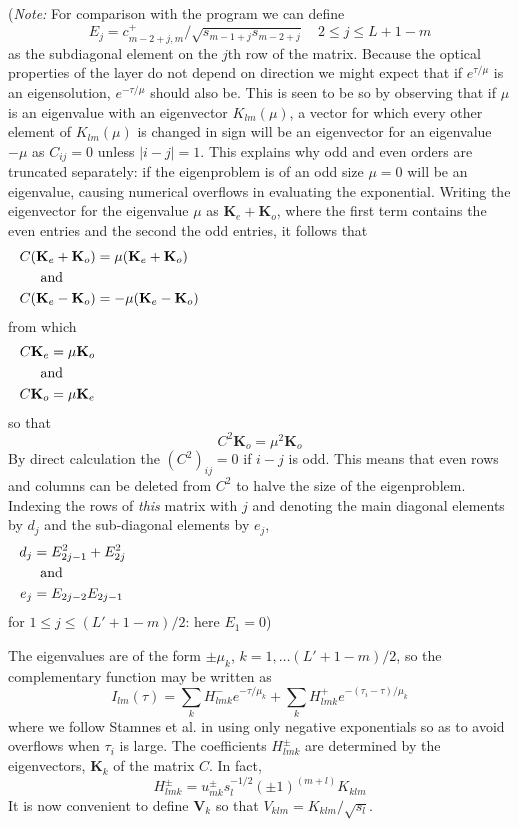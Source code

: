 ({\it Note:} For comparison with the program we can define 
\begin{equation}
E_j=c_{m-2+j,m}^+/\sqrt{s_{m-1+j}s_{m-2+j}} \quad 2 \leqslant j \leqslant L+1-m
\end{equation}
as the subdiagonal element on the $j$th row of the matrix. Because the
optical properties of the layer do not depend on direction we might expect
that if $e^{\tau/\mu}$ is an eigensolution, $e^{-\tau/\mu}$ should also be.
This is seen to be so by observing that if $\mu$ is an eigenvalue with an
eigenvector $K_{lm}(\mu)$, a vector for which every other element
of $K_{lm}(\mu)$ is changed in sign will be an eigenvector for an eigenvalue
$-\mu$ as $C_{ij}=0$ unless $|i-j|=1$. This explains why odd and even orders
are truncated separately: if the eigenproblem is of an odd size $\mu=0$ will
be an eigenvalue, causing numerical overflows in evaluating the exponential.
Writing the eigenvector for the eigenvalue $\mu$ as $\mathbf{K}_e
+\mathbf{K}_o$, where the first term contains the even entries and the second
the odd entries, it follows that
\begin{align}
C (\mathbf{K}_e+\mathbf{K}_o)&= \mu (\mathbf{K}_e+\mathbf{K}_o) \\
\noalign{and}
C (\mathbf{K}_e-\mathbf{K}_o)&= -\mu (\mathbf{K}_e-\mathbf{K}_o)
\end{align}
from which
\begin{align}
C \mathbf{K}_e &= \mu \mathbf{K}_o \\
\noalign{and}
C \mathbf{K}_o &= \mu \mathbf{K}_e
\end{align}
so that
\begin{equation}
C^2 \mathbf{K}_o = \mu^2 \mathbf{K}_o
\end{equation}
By direct calculation the $(C^2)_{ij}=0$ if $i-j$ is odd. This means that even
rows and columns can be deleted from $C^2$ to halve the size of the 
eigenproblem. Indexing the rows of {\em this} matrix with $j$ and denoting 
the main diagonal elements by $d_j$ and the sub-diagonal elements by $e_j$,
\begin{align}
d_j &= E_{2j-1}^2 + E_{2j}^2 \\
\noalign{and}
e_j &= E_{2j-2} E_{2j-1}
\end{align}
for $1\leqslant j \leqslant (L'+1-m)/2$: here $E_1=0$)

The eigenvalues are of the form $\pm \mu_k$, $k=1,\ldots(L'+1-m)/2$, 
so the complementary function may be written as
\begin{equation}
I_{lm}(\tau) = \sum_k H_{lmk}^- e^{-\tau/\mu_k} + \sum_k H_{lmk}^+ 
e^{-(\tau_i-\tau)/\mu_k}
\end{equation}
where we follow Stamnes {et al.} in using only negative exponentials so as 
to avoid overflows when $\tau_i$ is large. The coefficients $H_{lmk}^\pm$
are determined by the eigenvectors, $\mathbf{K}_k$ of the matrix $C$. In fact,
\begin{equation}
H_{lmk}^\pm = u_{mk}^\pm s_l^{-1/2} (\pm 1)^{(m+l)} K_{klm}
\end{equation}
It is now convenient to define $\mathbf{V}_k$ so that $V_{klm}=K_{klm}/
\sqrt{s_l}$.

